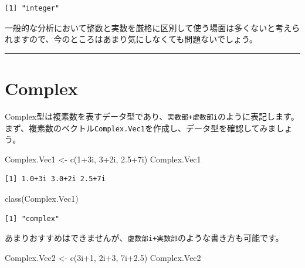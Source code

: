 \documentclass[
  a4paper,
  pandoc,
  ja=standard,
  jafont=haranoaji]{bxjsbook}
\newenvironment{Shaded}{\begin{snugshade}}{\end{snugshade}}
\newcommand{\DecValTok}[1]{\textcolor[rgb]{0.68,0.00,0.00}{#1}}
\newcommand{\FloatTok}[1]{\textcolor[rgb]{0.68,0.00,0.00}{#1}}
\newcommand{\FunctionTok}[1]{\textcolor[rgb]{0.28,0.35,0.67}{#1}}
\newcommand{\NormalTok}[1]{\textcolor[rgb]{0.00,0.48,0.65}{#1}}
\newcommand{\OtherTok}[1]{\textcolor[rgb]{0.00,0.48,0.65}{#1}}
\newcommand{\SpecialCharTok}[1]{\textcolor[rgb]{0.37,0.37,0.37}{#1}}
\begin{document}
\begin{verbatim}
[1] "integer"
\end{verbatim}

一般的な分析において整数と実数を厳格に区別して使う場面は多くないと考えられますので、今のところはあまり気にしなくても問題ないでしょう。

\begin{center}\rule{0.5\linewidth}{0.5pt}\end{center}

\hypertarget{sec-type_complex}{%
\section{Complex}\label{sec-type_complex}}

Complex型は複素数を表すデータ型であり、\texttt{実数部+虚数部i}のように表記します。まず、複素数のベクトル\texttt{Complex.Vec1}を作成し、データ型を確認してみましょう。

\begin{Shaded}
\begin{Highlighting}[numbers=left,,]
\NormalTok{Complex.Vec1 }\OtherTok{\textless{}{-}} \FunctionTok{c}\NormalTok{(}\DecValTok{1}\SpecialCharTok{+}\NormalTok{3i, }\DecValTok{3}\SpecialCharTok{+}\NormalTok{2i, }\FloatTok{2.5}\SpecialCharTok{+}\NormalTok{7i)}
\NormalTok{Complex.Vec1}
\end{Highlighting}
\end{Shaded}

\begin{verbatim}
[1] 1.0+3i 3.0+2i 2.5+7i
\end{verbatim}

\begin{Shaded}
\begin{Highlighting}[numbers=left,,]
\FunctionTok{class}\NormalTok{(Complex.Vec1)}
\end{Highlighting}
\end{Shaded}

\begin{verbatim}
[1] "complex"
\end{verbatim}

あまりおすすめはできませんが、\texttt{虚数部i+実数部}のような書き方も可能です。

\begin{Shaded}
\begin{Highlighting}[numbers=left,,]
\NormalTok{Complex.Vec2 }\OtherTok{\textless{}{-}} \FunctionTok{c}\NormalTok{(3i}\SpecialCharTok{+}\DecValTok{1}\NormalTok{, 2i}\SpecialCharTok{+}\DecValTok{3}\NormalTok{, 7i}\FloatTok{+2.5}\NormalTok{)}
\NormalTok{Complex.Vec2}
\end{Highlighting}
\end{Shaded}
\end{document}
